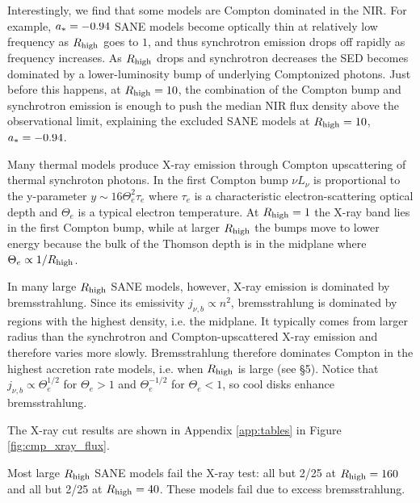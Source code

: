 Interestingly, we find that some models are Compton dominated in the NIR.  For example, $a_* = -0.94$ SANE models become optically thin at relatively low frequency as $R_\mathrm{high}$ goes to $1$, and thus synchrotron emission drops off rapidly as frequency increases.
As $R_\mathrm{high}$ drops and synchrotron decreases the SED becomes dominated by a lower-luminosity bump of underlying Comptonized photons.  Just before this happens, at $R_\mathrm{high} = 10$, the combination of the Compton bump and synchrotron emission is enough to push the median NIR flux density above the observational limit, explaining the excluded SANE models at $R_\mathrm{high} = 10$, $a_* = -0.94$.   



Many thermal models produce X-ray emission through Compton upscattering of thermal synchroton photons.  In the first Compton bump $\nu L_\nu$ is proportional to the y-parameter $y \sim 16 \Theta_e^2 \tau_e$ where $\tau_e$ is a characteristic electron-scattering optical depth and $\Theta_e$ is a typical electron temperature.  At $R_\mathrm{high} = 1$ the X-ray band lies in the first Compton bump, while at larger $R_\mathrm{high}$ the bumps move to lower energy because the bulk of the Thomson depth is in the midplane where $\Theta_e \propto 1/R_\mathrm{high}$.

In many large $R_\mathrm{high}$ SANE models, however, X-ray emission is dominated by bremsstrahlung.  Since its emissivity $j_{\nu,b} \propto n^2$, bremsstrahlung is dominated by regions with the highest density, i.e. the midplane.  It typically comes from larger radius than the synchrotron and Compton-upscattered X-ray emission and therefore varies more slowly.  Bremsstrahlung therefore dominates Compton in the highest accretion rate models, i.e. when $R_\mathrm{high}$ is large (see \S 5).  Notice that $j_{\nu,b} \propto \Theta_e^{1/2}$ for $\Theta_e > 1$ and $\Theta_e^{-1/2}$ for $\Theta_e < 1$, so cool disks enhance bremsstrahlung.  

The X-ray cut results are shown in Appendix \ref{app:tables} in Figure \ref{fig:cmp_xray_flux}.  

Most large $R_\mathrm{high}$ SANE models fail the X-ray test: all but 2/25 at $R_\mathrm{high} = 160$ and all but 2/25 at $R_\mathrm{high} = 40$.  These models fail due to excess bremsstrahlung.

